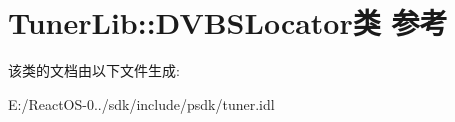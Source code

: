 \hypertarget{class_tuner_lib_1_1_d_v_b_s_locator}{}\section{Tuner\+Lib\+:\+:D\+V\+B\+S\+Locator类 参考}
\label{class_tuner_lib_1_1_d_v_b_s_locator}


该类的文档由以下文件生成\+:\begin{DoxyCompactItemize}
\item 
E\+:/\+React\+O\+S-\/0../sdk/include/psdk/tuner.\+idl\end{DoxyCompactItemize}
